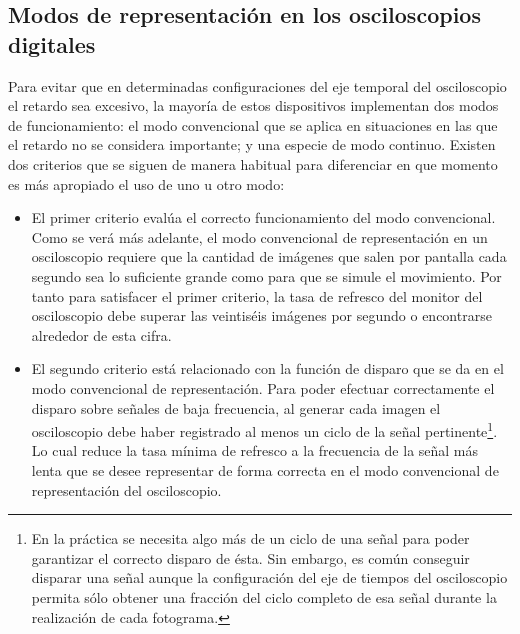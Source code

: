\subsection{Modos de representación en los osciloscopios digitales}\label{subsec:repmodes}

Para evitar que en determinadas configuraciones del eje temporal del osciloscopio el retardo sea excesivo, la mayoría de estos dispositivos implementan dos modos de funcionamiento: el modo convencional que se aplica en situaciones en las que el retardo no se considera importante; y una especie de modo continuo. Existen dos criterios que se siguen de manera habitual para diferenciar en que momento es más apropiado el uso de uno u otro modo:

\begin{itemize}
	\item El primer criterio evalúa el correcto funcionamiento del modo convencional. Como se verá más adelante, el modo convencional de representación en un osciloscopio requiere que la cantidad de imágenes que salen por pantalla cada segundo sea lo suficiente grande como para que se simule el movimiento. Por tanto para satisfacer el primer criterio, la tasa de refresco del monitor del osciloscopio debe superar las veintiséis imágenes por segundo o encontrarse alrededor de esta cifra.
	\item El segundo criterio está relacionado con la función de disparo que se da en el modo convencional de representación. Para poder efectuar correctamente el disparo sobre señales de baja frecuencia, al generar cada imagen el osciloscopio debe haber registrado al menos un ciclo de la señal pertinente\footnote{En la práctica se necesita algo más de un ciclo de una señal para poder garantizar el correcto disparo de ésta. Sin embargo, es común conseguir disparar una señal aunque la configuración del eje de tiempos del osciloscopio permita sólo obtener una fracción del ciclo completo de esa señal durante la realización de cada fotograma.}. Lo cual reduce la tasa mínima de refresco a la frecuencia de la señal más lenta que se desee representar de forma correcta en el modo convencional de representación del osciloscopio.
\end{itemize}

